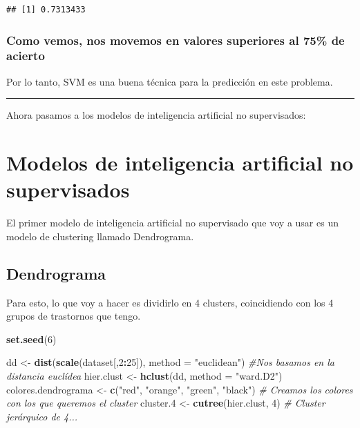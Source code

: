 \documentclass[]{article}
\newenvironment{Shaded}{\begin{snugshade}}{\end{snugshade}}
\newcommand{\KeywordTok}[1]{\textcolor[rgb]{0.13,0.29,0.53}{\textbf{#1}}}
\newcommand{\DataTypeTok}[1]{\textcolor[rgb]{0.13,0.29,0.53}{#1}}
\newcommand{\DecValTok}[1]{\textcolor[rgb]{0.00,0.00,0.81}{#1}}
\newcommand{\StringTok}[1]{\textcolor[rgb]{0.31,0.60,0.02}{#1}}
\newcommand{\CommentTok}[1]{\textcolor[rgb]{0.56,0.35,0.01}{\textit{#1}}}
\newcommand{\OperatorTok}[1]{\textcolor[rgb]{0.81,0.36,0.00}{\textbf{#1}}}
\newcommand{\NormalTok}[1]{#1}
\begin{document}
\begin{verbatim}
## [1] 0.7313433
\end{verbatim}

\subsubsection{Como vemos, nos movemos en valores superiores al 75\% de
acierto}\label{como-vemos-nos-movemos-en-valores-superiores-al-75-de-acierto}

Por lo tanto, SVM es una buena técnica para la predicción en este
problema.

\begin{center}\rule{0.5\linewidth}{\linethickness}\end{center}

Ahora pasamos a los modelos de inteligencia artificial no supervisados:

\section{Modelos de inteligencia artificial no
supervisados}\label{modelos-de-inteligencia-artificial-no-supervisados}

El primer modelo de inteligencia artificial no supervisado que voy a
usar es un modelo de clustering llamado Dendrograma.

\subsection{Dendrograma}\label{dendrograma}

Para esto, lo que voy a hacer es dividirlo en 4 clusters, coincidiendo
con los 4 grupos de trastornos que tengo.

\begin{Shaded}
\begin{Highlighting}[]
\KeywordTok{set.seed}\NormalTok{(}\DecValTok{6}\NormalTok{)}

\NormalTok{dd <-}\StringTok{ }\KeywordTok{dist}\NormalTok{(}\KeywordTok{scale}\NormalTok{(dataset[,}\DecValTok{2}\OperatorTok{:}\DecValTok{25}\NormalTok{]), }\DataTypeTok{method =} \StringTok{"euclidean"}\NormalTok{) }\CommentTok{#Nos basamos en la distancia euclídea}
\NormalTok{hier.clust <-}\StringTok{ }\KeywordTok{hclust}\NormalTok{(dd, }\DataTypeTok{method =} \StringTok{"ward.D2"}\NormalTok{)}
\NormalTok{colores.dendrograma <-}\StringTok{ }\KeywordTok{c}\NormalTok{(}\StringTok{"red"}\NormalTok{, }\StringTok{"orange"}\NormalTok{, }\StringTok{"green"}\NormalTok{, }\StringTok{"black"}\NormalTok{) }\CommentTok{# Creamos los colores con los que queremos el cluster}
\NormalTok{cluster.}\DecValTok{4}\NormalTok{ <-}\StringTok{ }\KeywordTok{cutree}\NormalTok{(hier.clust, }\DecValTok{4}\NormalTok{) }\CommentTok{# Cluster jerárquico de 4...}
\end{Highlighting}
\end{Shaded}
\end{document}
